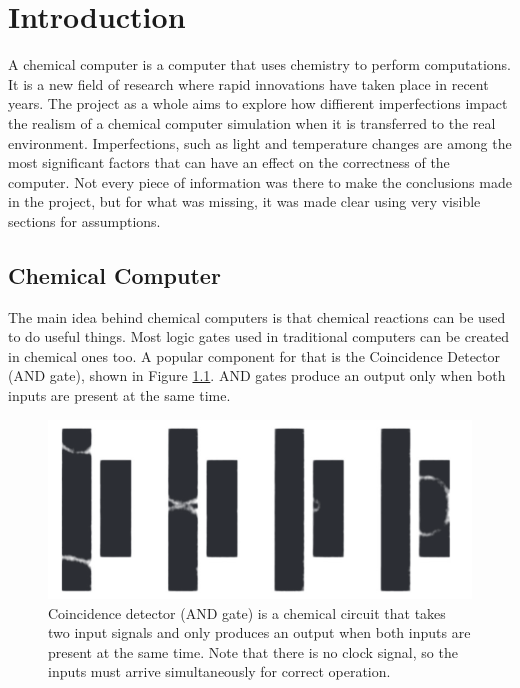 \chapter{Introduction}

A chemical computer is a computer that uses chemistry to perform computations. It is a new field of research where rapid innovations have taken place in recent years.
The project as a whole aims to explore how diffierent imperfections impact the realism of a chemical computer simulation when it is transferred to the real environment. 
Imperfections, such as light and temperature changes are among the most significant factors that can have an effect on the correctness of the computer.
Not every piece of information was there to make the conclusions made in the project, but for what was missing, it was made clear using very visible sections for assumptions.

\section{Chemical Computer}
The main idea behind chemical computers is that chemical reactions can be used to do useful things. 
Most logic gates used in traditional computers can be created in chemical ones too.
A popular component for that is the Coincidence Detector (AND gate), shown in Figure \ref{fig:coincidence-detector-sequence}. AND gates produce an output only when both inputs are present at the same time.

\begin{figure}
    \centering
    \includegraphics[width=0.75\linewidth]{images/Screenshot 2024-03-10 at 19.40.45.png}
    \caption{Coincidence detector (AND gate) is a chemical circuit that takes two input signals and only produces an output when both inputs are present at the same time. Note that there is no clock signal, so the inputs must arrive simultaneously for correct operation. \citep{gorecki2003chemical}}
    \label{fig:coincidence-detector-sequence}
\end{figure}





